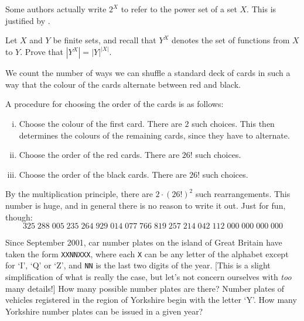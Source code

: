 Some authors actually write $2^X$ to refer to the power set of a set $X$. This is justified by .

\begin{exercise}
Let $X$ and $Y$ be finite sets, and recall that $Y^X$ denotes the set of functions from $X$ to $Y$. Prove that $|Y^X|=|Y|^{|X|}$.
\end{exercise}

\begin{example}
We count the number of ways we can shuffle a standard deck of cards in such a way that the colour of the cards alternate between red and black.

A procedure for choosing the order of the cards is as follows:
\begin{enumerate}[(i)]
\item Choose the colour of the first card. There are $2$ such choices. This then determines the colours of the remaining cards, since they have to alternate.
\item Choose the order of the red cards. There are $26!$ such choices.
\item Choose the order of the black cards. There are $26!$ such choices.
\end{enumerate}
By the multiplication principle, there are $2 \cdot (26!)^2$ such rearrangements. This number is huge, and in general there is no reason to write it out. Just for fun, though:
\[325\;288\;005\;235\;264\;929\;014\;077\;766\;819\;257\;214\;042\;112\;000\;000\;000\;000\]
\end{example}

\begin{exercise}
Since September 2001, car number plates on the island of Great Britain have taken the form \texttt{XX\;NN\;XXX}, where each \texttt{X} can be any letter of the alphabet except for `I', `Q' or `Z', and \texttt{NN} is the last two digits of the year. [This is a slight simplification of what is really the case, but let's not concern ourselves with \textit{too} many details!] How many possible number plates are there? Number plates of vehicles registered in the region of Yorkshire begin with the letter `Y'. How many Yorkshire number plates can be issued in a given year?
\end{exercise}

